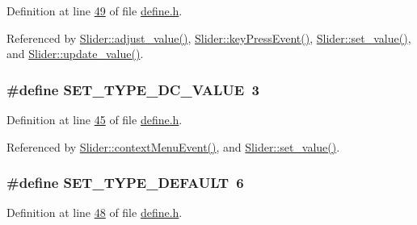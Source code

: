 Definition at line \hyperlink{a00034_source_l00049}{49} of file \hyperlink{a00034_source}{define.\+h}.



Referenced by \hyperlink{a00046_source_l00069}{Slider\+::adjust\+\_\+value()}, \hyperlink{a00046_source_l00219}{Slider\+::key\+Press\+Event()}, \hyperlink{a00046_source_l00102}{Slider\+::set\+\_\+value()}, and \hyperlink{a00046_source_l00088}{Slider\+::update\+\_\+value()}.

\hypertarget{a00034_a347f6ec80828b93988d22989c0df015f}{
\subsubsection[{S\+E\+T\+\_\+\+T\+Y\+P\+E\+\_\+\+D\+C\+\_\+\+V\+A\+L\+U\+E}]{\setlength{\rightskip}{0pt plus 5cm}\#define S\+E\+T\+\_\+\+T\+Y\+P\+E\+\_\+\+D\+C\+\_\+\+V\+A\+L\+U\+E~3}}\label{a00034_a347f6ec80828b93988d22989c0df015f}


Definition at line \hyperlink{a00034_source_l00045}{45} of file \hyperlink{a00034_source}{define.\+h}.



Referenced by \hyperlink{a00046_source_l00309}{Slider\+::context\+Menu\+Event()}, and \hyperlink{a00046_source_l00102}{Slider\+::set\+\_\+value()}.

\hypertarget{a00034_afd1036bf6329d2ac31913e14c1f56725}{
\subsubsection[{S\+E\+T\+\_\+\+T\+Y\+P\+E\+\_\+\+D\+E\+F\+A\+U\+L\+T}]{\setlength{\rightskip}{0pt plus 5cm}\#define S\+E\+T\+\_\+\+T\+Y\+P\+E\+\_\+\+D\+E\+F\+A\+U\+L\+T~6}}\label{a00034_afd1036bf6329d2ac31913e14c1f56725}


Definition at line \hyperlink{a00034_source_l00048}{48} of file \hyperlink{a00034_source}{define.\+h}.



